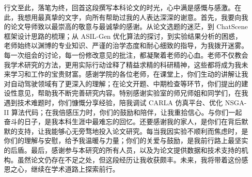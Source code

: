 \begin{acknowledgements} 

行文至此，落笔为终，回首这段撰写本科论文的时光，心中满是感慨与感激。在此，我想用最真挚的文字，向所有帮助过我的人表达深深的谢意。​
首先，我要向我的论文导师致以最崇高的敬意与最诚挚的感谢。从论文选题的迷茫，到 ChatScene 框架设计思路的梳理；从 ASIL-Gen 优化算法的探讨，到实验结果分析的困惑，老师始终以渊博的专业知识、严谨的治学态度和耐心细致的指导，为我拨开迷雾。每一次组会的讨论，每一份修改意见的批注，都凝聚着老师的心血。老师不仅教会我学术研究的方法，更用实际行动诠释了精益求精的科研精神，这些都将成为我未来学习和工作的宝贵财富。​
感谢学院的各位老师，在课堂上，你们生动的讲解让我对自动驾驶领域有了更深入的理解；在论文开题、中期检查等环节，你们提出的建设性意见，帮助我不断完善研究内容。特别感谢实验室的师兄师姐和同学们，在我遇到技术难题时，你们慷慨分享经验，陪我调试 CARLA 仿真平台、优化 NSGA-II 算法代码；在我倍感压力时，你们的鼓励和陪伴，让我重拾信心。与你们一起奋斗的日子，是我本科生涯中最难忘的回忆。​
还要感谢我的家人，是你们在背后默默的支持，让我能够心无旁骛地投入论文研究。每当我因实验不顺利而焦虑时，是你们的理解与安慰，给予我温暖与力量；你们的关爱与鼓励，是我前行路上最坚实的后盾。​
最后，感谢参与本研究的所有人员，以及为论文提供数据和技术支持的机构。虽然论文仍存在不足之处，但这段经历让我收获颇丰。未来，我将带着这份感恩之心，继续在学术道路上探索前行。

\end{acknowledgements}

